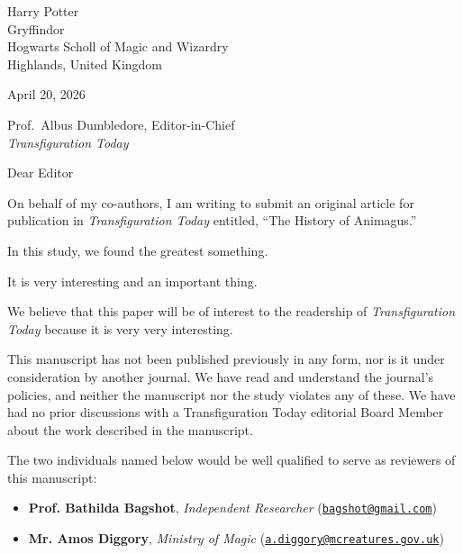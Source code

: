 \documentclass[
]{scrartcl}
\providecommand{\tightlist}{%
  \setlength{\itemsep}{0pt}\setlength{\parskip}{0pt}}
\begin{document}
\begin{flushright}
Harry Potter
\\ Gryffindor
\\ Hogwarts Scholl of Magic and Wizardry
\\ Highlands, United Kingdom



\vspace{1.5em}
April 20, 2026
\end{flushright}

\vspace{2.5em}

\begin{flushleft}
Prof.~Albus Dumbledore, Editor-in-Chief
\\ \textit{Transfiguration Today}
\end{flushleft}

\vspace{2em}

Dear Editor

On behalf of my co-authors, I am writing to submit an original article for publication in \emph{Transfiguration Today} entitled, ``The History of Animagus.''

In this study, we found the greatest something.

It is very interesting and an important thing.

We believe that this paper will be of interest to the readership of \emph{Transfiguration Today} because it is very very interesting.

This manuscript has not been published previously in any form, nor is it under consideration by another journal.
We have read and understand the journal's policies, and neither the manuscript nor the study violates any of these.
We have had no prior discussions with a Transfiguration Today editorial Board Member about the work described in the manuscript.

The two individuals named below would be well qualified to serve as reviewers of this manuscript:

\label{recommend}
\begin{itemize}
\tightlist
\item
  \textbf{Prof. Bathilda Bagshot}, \emph{Independent Researcher} (\href{mailto:bagshot@gmail.com}{\nolinkurl{bagshot@gmail.com}})
\item
  \textbf{Mr. Amos Diggory}, \emph{Ministry of Magic} (\href{mailto:a.diggory@mcreatures.gov.uk}{\nolinkurl{a.diggory@mcreatures.gov.uk}})
\end{itemize}
\end{document}

